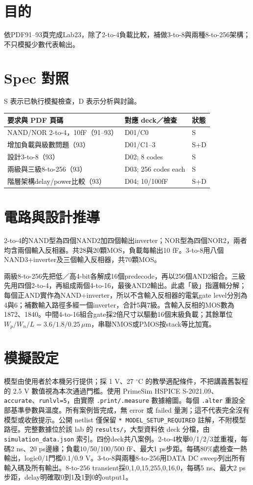 \section{目的}
依PDF91--93頁完成Lab23，除了2-to-4負載比較，補做3-to-8與兩種8-to-256架構；不只模擬少數代表輸出。

\section{Spec 對照}
S 表示已執行模擬檢查，D 表示分析與討論。

\small\begin{longtable}{p{.46\linewidth}p{.30\linewidth}p{.15\linewidth}}\toprule
要求與 PDF 頁碼 & 對應 deck／檢查 & 狀態 \\ \midrule\endhead
NAND/NOR 2-to-4，10fF（91--93） & D01/C0 & S \\
增加負載與級數問題（93） & D01/C1--3 & S+D \\
設計3-to-8（93） & D02; 8 codes & S \\
兩級與三級8-to-256（93） & D03; 256 codes each & S \\
階層架構delay/power比較（93） & D04; 10/100fF & S+D \\
\bottomrule\end{longtable}\normalsize


\section{電路與設計推導}
2-to-4的NAND型為四個NAND2加四個輸出inverter；NOR型為四個NOR2，兩者均含兩個輸入反相器。共28與20顆MOS，負載每輸出10 fF。3-to-8用八個NAND3+inverter及三個輸入反相器，共70顆MOS。

兩級8-to-256先把低／高4-bit各解成16個predecode，再以256個AND2組合。三級先用四個2-to-4，再組成兩個4-to-16，最後AND2輸出。此處「級」指邏輯分解；每個正AND實作為NAND+inverter，所以不含輸入反相器的電氣gate level分別為4與6；補數輸入路徑多經一個inverter，合計5與7級。含輸入反相的MOS數為1872、1840。中間4-to-16組合gate採2倍尺寸以驅動16個末級負載；其餘單位 $W_p/W_n/L=3.6/1.8/0.25\,\mu$m，串聯NMOS或PMOS按stack等比加寬。

\section{模擬設定}
模型由使用者於本機另行提供；採 1 V、27 $^\circ$C 的教學適配條件，不把講義舊製程的 2.5 V 數值視為本次通過門檻。使用 PrimeSim HSPICE S-2021.09、\texttt{accurate}、\texttt{runlvl=5}，由實際 \texttt{.print/.measure} 數據繪圖。每個 \texttt{.alter} 重設全部基準參數與溫度。所有案例皆完成，無 error 或 failed 量測；這不代表完全沒有模型或收斂提示。公開 netlist 僅保留 \texttt{* MODEL\_SETUP\_REQUIRED} 註解，不附模型路徑。完整數據位於該 lab 的 \texttt{results/}，大型資料依 deck 分檔，由 \texttt{simulation\_data.json} 索引。四份deck共八案例。2-to-4枚舉0/1/2/3並重複，每碼2 ns、20 ps邊緣；負載10/50/100/500 fF、最大1 ps步距。每碼80\%處檢查一熱輸出，logic0/1門檻0.1/0.9 V。3-to-8與兩種8-to-256用DATA DC sweep列出所有輸入碼及所有輸出。8-to-256 transient採0,1,0,15,255,0,16,0，每碼5 ns、最大2 ps步距，delay明確取0到1及1到0的output1。

